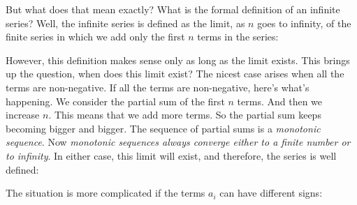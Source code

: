 \documentclass[pdftex, brazil, 12pt, twoside]{article}
\begin{document}
But what does that mean exactly?
What is the formal definition of an infinite series?
Well, the infinite series is defined as the limit, as $n$
goes to infinity, of the finite series in which we add
only the first $n$ terms in the series:

\begin{figure}[H]
  \begin{center}
  \end{center}
\end{figure}

However, this definition makes sense only as long as the
limit exists.
This brings up the question, when does this limit exist?
The nicest case arises when all the terms are
non-negative.
If all the terms are non-negative,
here's what's happening.
We consider the partial sum of the first $n$ terms.
And then we increase $n$.
This means that we add more terms.
So the partial sum keeps becoming bigger and bigger.
The sequence of partial sums is a \emph{monotonic sequence}.
Now \emph{monotonic sequences always converge either to a finite
number or to infinity}.
In either case, this limit will exist, and therefore, the series is well defined:

\begin{figure}[H]
  \begin{center}
  \end{center}
\end{figure}

The situation is more complicated if the terms $a_i$
can have different signs:
\end{document}
